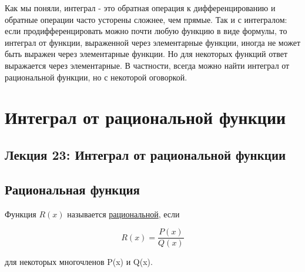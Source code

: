     Как мы поняли, интеграл - это обратная операция к дифференцированию и обратные операции часто усторены сложнее, чем прямые. Так и с интегралом: если продифференцировать можно почти любую функцию в виде формулы, то интеграл от функции, выраженной через элементарные функции, иногда не может быть выражен через элементарные функции. Но для некоторых функций ответ выражается через элементарные. В частности, всегда можно найти интеграл от рациональной функции, но с некоторой оговоркой.
	
	\chapter{Интеграл от рациональной функции}
	
	\section*{Лекция 23: Интеграл от рациональной функции}
	
	\section{Рациональная функция}
	
	\begin{definition}
		Функция $R(x)$ называется \underline{рациональной}, если 
		
		\[R(x) = \frac{P(x)}{Q(x)}\]
		
		для некоторых многочленов P(x) и Q(x).
	\end{definition}
	
